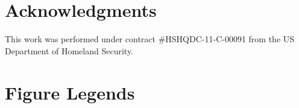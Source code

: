 \documentclass[10pt]{article}
\begin{document}
\section*{Acknowledgments}
This work was performed under contract \#HSHQDC-11-C-00091 from the US Department of Homeland Security.



\clearpage

\section*{Figure Legends}
\end{document}
